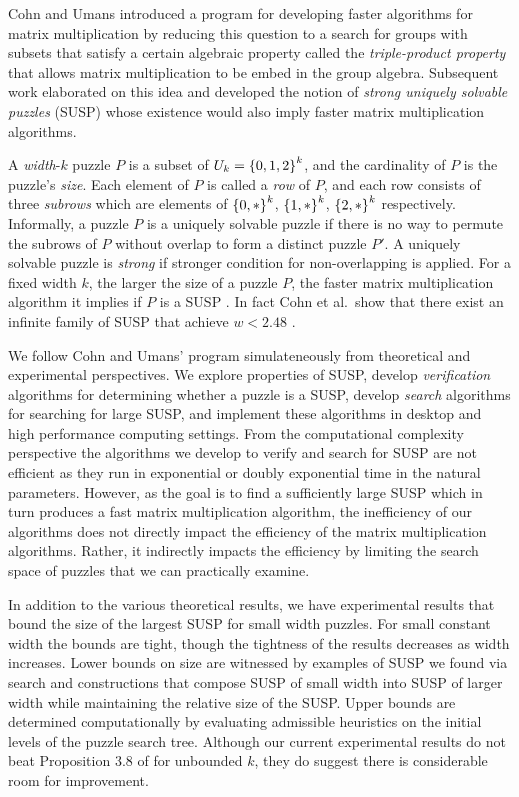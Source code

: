 \documentclass[11pt]{article}
\begin{document}

Cohn and Umans \cite{cu03} introduced a program for developing faster
algorithms for matrix multiplication by reducing this question to a
search for groups with subsets that satisfy a certain algebraic
property called the \emph{triple-product property} that allows matrix
multiplication to be embed in the group algebra.  Subsequent work
\cite{cksu05} elaborated on this idea and developed the notion of
\emph{strong uniquely solvable puzzles} (SUSP) whose existence would
also imply faster matrix multiplication algorithms.

A \emph{width}-$k$ puzzle $P$ is a subset of $U_k = \left\{ 0,1,2 \right\}^k$,
and the cardinality of $P$ is the puzzle's \emph{size}.  Each element
of $P$ is called a \emph{row} of $P$, and each row consists of three
\emph{subrows} which are elements of $\left\{ 0,* \right\}^k$, $\left\{ 1,* \right\}^k$,
$\left\{ 2,* \right\}^k$ respectively.  Informally, a puzzle $P$ is a uniquely
solvable puzzle if there is no way to permute the subrows of $P$
without overlap to form a distinct puzzle $P'$.  A uniquely solvable
puzzle is \emph{strong} if stronger condition for non-overlapping is
applied. For a fixed width $k$, the larger the size of a puzzle $P$,
the faster matrix multiplication algorithm it implies if $P$ is a SUSP
\cite[Corollary 3.6]{cksu05}.  In fact Cohn et al.~show that there
exist an infinite family of SUSP that achieve $w < 2.48$
\cite[Proposition 3.8]{cksu05}.


We follow Cohn and Umans' program simulateneously from theoretical and
experimental perspectives.  We explore properties of SUSP, develop
\emph{verification} algorithms for determining whether a puzzle is a
SUSP, develop \emph{search} algorithms for searching for large SUSP,
and implement these algorithms in desktop and high performance
computing settings.  From the computational complexity perspective the
algorithms we develop to verify and search for SUSP are not efficient
as they run in exponential or doubly exponential time in the natural
parameters.  However, as the goal is to find a sufficiently large SUSP
which in turn produces a fast matrix multiplication algorithm, the
inefficiency of our algorithms does not directly impact the efficiency
of the matrix multiplication algorithms.  Rather, it indirectly
impacts the efficiency by limiting the search space of puzzles that we
can practically examine.


In addition to the various theoretical results, we have experimental
results that bound the size of the largest SUSP for small width
puzzles.  For small constant width the bounds are tight, though the
tightness of the results decreases as width increases.  Lower bounds
on size are witnessed by examples of SUSP we found via search and
constructions that compose SUSP of small width into SUSP of larger
width while maintaining the relative size of the SUSP.  Upper bounds
are determined computationally by evaluating admissible heuristics on
the initial levels of the puzzle search tree.  Although our current
experimental results do not beat Proposition 3.8 of \cite{cksu05} for
unbounded $k$, they do suggest there is considerable room for
improvement.
\end{document}
